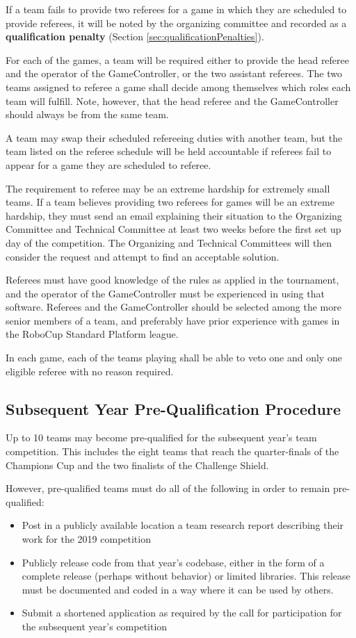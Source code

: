 \documentclass[12pt]{article}
\begin{document}
If a team fails to provide two referees for a game in which they are scheduled to provide referees, it will be noted by the organizing committee and recorded as a \textbf{qualification penalty} (Section \ref {sec:qualificationPenalties}).

For each of the games, a team will be required either to provide the head referee and the operator of the GameController, or the two assistant referees.  The two teams assigned to referee a game shall decide among themselves which roles each team will fulfill. Note, however, that the head referee and the GameController should always be from the same team.

A team may swap their scheduled refereeing duties with another team, but the team listed on the referee schedule will be held accountable if referees fail to appear for a game they are scheduled to referee.

The requirement to referee may be an extreme hardship for extremely small teams.  If a team believes providing two referees for games will be an extreme hardship, they must send an email explaining their situation to the Organizing Committee and Technical Committee at least two weeks before the first set up day of the competition.  The Organizing and Technical Committees will then consider the request and attempt to find an acceptable solution.

Referees must have good knowledge of the rules as applied in the tournament, and the operator of the GameController must be experienced in using that software. Referees and the GameController should be selected among the more senior members of a team, and preferably have prior experience with games in the RoboCup Standard Platform league.

In each game, each of the teams playing shall be able to veto one and only one eligible referee with no reason required.


\subsection{Subsequent Year Pre-Qualification Procedure}
\label{sec:preQual}
Up to 10 teams may become pre-qualified for the subsequent year's team competition. This includes the eight teams that reach the quarter-finals of the Champions Cup and the two finalists of the Challenge Shield.

However, pre-qualified teams must do all of the following in order to remain pre-qualified:
\begin{itemize}
\item Post in a publicly available location a team research report describing their work for the 2019 competition
\item Publicly release code from that year's codebase, either in the form of a complete release (perhaps without behavior) or limited libraries.  This release must be documented and coded in a way where it can be used by others.
\item Submit a shortened application as required by the call for participation for the subsequent year's competition
\end{itemize}
\end{document}
